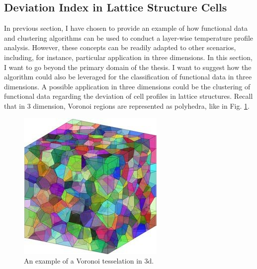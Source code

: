 \subsection{Deviation Index in Lattice Structure Cells}
\label{subsec:devcell}
In previous section, I have chosen to provide an example of how functional data and clustering algorithms can be used to conduct a layer-wise temperature profile analysis. However, these concepts can be readily adapted to other scenarios, including, for instance, particular application in three dimensions. In this section, I want to go beyond the primary domain of the thesis. I want to suggest how the algorithm could also be leveraged for the classification of functional data in three dimensions. A possible application in three dimensions could be the clustering of functional data regarding the deviation of cell profiles in lattice structures. Recall that in 3 dimension, Voronoi regions are represented as polyhedra, like in Fig. \ref{fig:3dvoronoi}.

\begin{figure}[H]
    \centering
    \includegraphics[scale=0.43]{Images/3D-Voronoi-tessellation-with-1000-grains-unit-cell-with-its-internal-grains-not.png}
    \caption[3d Voronoi tessellation.]{An example of a Voronoi tesselation in 3d.}
    \label{fig:3dvoronoi}
\end{figure}

